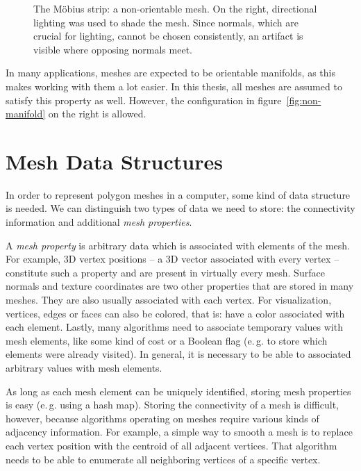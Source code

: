 \begin{figure}[t]
  \centering
  
  \caption{The Möbius strip: a non-orientable mesh.
    On the right, directional lighting was used to shade the mesh.
    Since normals, which are crucial for lighting, cannot be chosen consistently, an artifact is visible where opposing normals meet.}
  \label{fig:moebius}
\end{figure}


In many applications, meshes are expected to be orientable manifolds, as this makes working with them a lot easier.
In this thesis, all meshes are assumed to satisfy this property as well.
However, the configuration in figure~\ref{fig:non-manifold} on the right is allowed.


\section{Mesh Data Structures}

In order to represent polygon meshes in a computer, some kind of data structure is needed.
We can distinguish two types of data we need to store: the connectivity information and additional \emph{mesh properties}.

A \emph{mesh property} is arbitrary data which is associated with elements of the mesh.
For example, 3D vertex positions -- a 3D vector associated with every vertex -- constitute such a property and are present in virtually every mesh.
Surface normals and texture coordinates are two other properties that are stored in many meshes.
They are also usually associated with each vertex.
For visualization, vertices, edges or faces can also be colored, that is: have a color associated with each element.
Lastly, many algorithms need to associate temporary values with mesh elements, like some kind of cost or a Boolean flag (e.\,g. to store which elements were already visited).
In general, it is necessary to be able to associated arbitrary values with mesh elements.

As long as each mesh element can be uniquely identified, storing mesh properties is easy (e.\,g. using a hash map).
Storing the connectivity of a mesh is difficult, however, because algorithms operating on meshes require various kinds of adjacency information.
For example, a simple way to smooth a mesh is to replace each vertex position with the centroid of all adjacent vertices.
That algorithm needs to be able to enumerate all neighboring vertices of a specific vertex.


